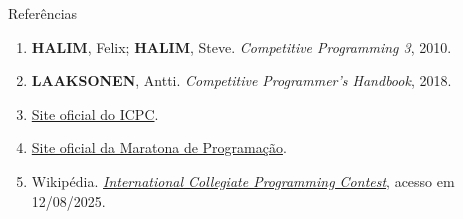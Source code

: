 \begin{frame}[fragile]{Referências}

    \begin{enumerate}
        \item \textbf{HALIM}, Felix; \textbf{HALIM}, Steve. \textit{Competitive Programming 3}, 2010.
        \item \textbf{LAAKSONEN}, Antti. \textit{Competitive Programmer's Handbook}, 2018.

        \item \href{https://icpc.baylor.edu/}{Site oficial do ICPC}.

        \item \href{http://maratona.ime.usp.br/}{Site oficial da Maratona de Programação}.

        \item Wikipédia. \href{https://en.wikipedia.org/wiki/ACM\_International\_Collegiate\_Programming\_Contest}{\it International Collegiate Programming Contest}, acesso em 12/08/2025.


    \end{enumerate}

\end{frame}
